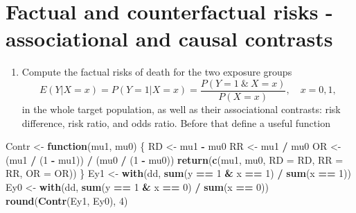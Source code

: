 \documentclass[
]{book}
\newenvironment{Shaded}{\begin{snugshade}}{\end{snugshade}}
\newcommand{\AttributeTok}[1]{\textcolor[rgb]{0.13,0.29,0.53}{#1}}
\newcommand{\ControlFlowTok}[1]{\textcolor[rgb]{0.13,0.29,0.53}{\textbf{#1}}}
\newcommand{\DecValTok}[1]{\textcolor[rgb]{0.00,0.00,0.81}{#1}}
\newcommand{\FunctionTok}[1]{\textcolor[rgb]{0.13,0.29,0.53}{\textbf{#1}}}
\newcommand{\NormalTok}[1]{#1}
\newcommand{\OtherTok}[1]{\textcolor[rgb]{0.56,0.35,0.01}{#1}}
\newcommand{\SpecialCharTok}[1]{\textcolor[rgb]{0.81,0.36,0.00}{\textbf{#1}}}
\providecommand{\tightlist}{%
  \setlength{\itemsep}{0pt}\setlength{\parskip}{0pt}}
\begin{document}
\section{Factual and counterfactual risks - associational and causal contrasts}\label{factual-and-counterfactual-risks---associational-and-causal-contrasts}

\begin{enumerate}
\def\labelenumi{\arabic{enumi}.}
\tightlist
\item
  Compute the factual risks of death for the two exposure groups
  \[ E(Y|X=x) = P(Y=1|X=x) = \frac{P(Y=1\ \&\ X=x)}{P(X=x)},
  \quad x=0,1, \] in the whole target population, as well as their
  associational contrasts: risk difference, risk ratio, and odds
  ratio. Before that define a useful function
\end{enumerate}

\begin{Shaded}
\begin{Highlighting}[]
\NormalTok{Contr }\OtherTok{\textless{}{-}} \ControlFlowTok{function}\NormalTok{(mu1, mu0) \{}
\NormalTok{  RD }\OtherTok{\textless{}{-}}\NormalTok{ mu1 }\SpecialCharTok{{-}}\NormalTok{ mu0}
\NormalTok{  RR }\OtherTok{\textless{}{-}}\NormalTok{ mu1 }\SpecialCharTok{/}\NormalTok{ mu0}
\NormalTok{  OR }\OtherTok{\textless{}{-}}\NormalTok{ (mu1 }\SpecialCharTok{/}\NormalTok{ (}\DecValTok{1} \SpecialCharTok{{-}}\NormalTok{ mu1)) }\SpecialCharTok{/}\NormalTok{ (mu0 }\SpecialCharTok{/}\NormalTok{ (}\DecValTok{1} \SpecialCharTok{{-}}\NormalTok{ mu0))}
  \FunctionTok{return}\NormalTok{(}\FunctionTok{c}\NormalTok{(mu1, mu0, }\AttributeTok{RD =}\NormalTok{ RD, }\AttributeTok{RR =}\NormalTok{ RR, }\AttributeTok{OR =}\NormalTok{ OR))}
\NormalTok{\}}
\NormalTok{Ey1 }\OtherTok{\textless{}{-}} \FunctionTok{with}\NormalTok{(dd, }\FunctionTok{sum}\NormalTok{(y }\SpecialCharTok{==} \DecValTok{1} \SpecialCharTok{\&}\NormalTok{ x }\SpecialCharTok{==} \DecValTok{1}\NormalTok{) }\SpecialCharTok{/} \FunctionTok{sum}\NormalTok{(x }\SpecialCharTok{==} \DecValTok{1}\NormalTok{))}
\NormalTok{Ey0 }\OtherTok{\textless{}{-}} \FunctionTok{with}\NormalTok{(dd, }\FunctionTok{sum}\NormalTok{(y }\SpecialCharTok{==} \DecValTok{1} \SpecialCharTok{\&}\NormalTok{ x }\SpecialCharTok{==} \DecValTok{0}\NormalTok{) }\SpecialCharTok{/} \FunctionTok{sum}\NormalTok{(x }\SpecialCharTok{==} \DecValTok{0}\NormalTok{))}
\FunctionTok{round}\NormalTok{(}\FunctionTok{Contr}\NormalTok{(Ey1, Ey0), }\DecValTok{4}\NormalTok{)}
\end{Highlighting}
\end{Shaded}
\end{document}
